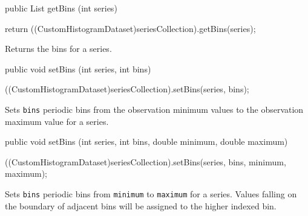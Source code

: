 \begin{htmlonly}
\end{htmlonly}
\begin{code}

   public List getBins (int series) \begin{hide} {
      return ((CustomHistogramDataset)seriesCollection).getBins(series);
   }\end{hide}
\end{code}
\begin{tabb}
   Returns the bins for a series.
\end{tabb}
\begin{htmlonly}
\end{htmlonly}
\begin{code}

   public void setBins (int series, int bins) \begin{hide} {
      ((CustomHistogramDataset)seriesCollection).setBins(series, bins);
   }\end{hide}
\end{code}
\begin{tabb}
   Sets \texttt{bins} periodic bins from the observation minimum values to the observation maximum value for a series.
\end{tabb}
\begin{htmlonly}
\end{htmlonly}
\begin{code}

   public void setBins (int series, int bins, double minimum, double maximum) \begin{hide} {
      ((CustomHistogramDataset)seriesCollection).setBins(series, bins, minimum, maximum);
   }\end{hide}
\end{code}
\begin{tabb}
   Sets \texttt{bins} periodic bins from \texttt{minimum} to \texttt{maximum} for a series.
   Values falling on the boundary of adjacent bins will be assigned to the higher indexed bin.
\end{tabb}
